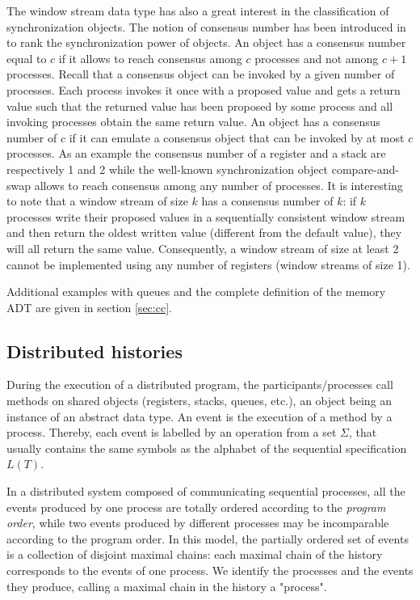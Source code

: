 \documentclass[9pt,numbers]{sigplanconf}
\begin{document}
The window stream data type has also a great interest in the classification of synchronization objects. The notion of consensus number has been introduced in \cite{herlihy1991wait} to rank the synchronization power of objects. An object has a consensus number equal to $c$ if it allows to reach consensus among $c$ processes and not among $c+1$ processes. Recall that a consensus object can be invoked by a given number of processes. Each process invokes it once with a proposed value and gets a return value such that the returned value has been proposed by some process and all invoking processes obtain the same return value. An object has a consensus number of $c$ if it can emulate a consensus object that can be invoked by at most $c$ processes. As an example the consensus number of a register and a stack are respectively 1 and 2 while the well-known synchronization object compare-and-swap allows to reach consensus among any number of processes. It is interesting to note that a window stream of size $k$ has a consensus number of $k$: if $k$ processes write their proposed values in a sequentially consistent window stream and then return the oldest written value (different from the default value), they will all return the same value. Consequently, a window stream of size at least 2 cannot be implemented using any number of registers (window streams of size 1). 

Additional examples with queues and the complete definition of the memory ADT are given in section \ref{sec:cc}.

\subsection{Distributed histories}

During the execution of a distributed program, the participants/processes call methods on
shared objects (registers, stacks, queues, etc.), an object being an instance of an abstract
data type. An event is the execution of a method by a process. Thereby, each event is labelled 
by an operation from a set $\Sigma$, that usually contains the same symbols as the alphabet 
of the sequential specification $L(T)$.

In a distributed system composed of communicating sequential processes,
all the events produced by one process are totally ordered according to the \emph{program order},
while two events produced by different processes may be incomparable according to the program order. 
In this model, the partially ordered set of events is a collection of disjoint maximal chains: 
each maximal chain of the history corresponds to the events of one process. 
We identify the processes and the events they produce, calling a maximal chain in the history a "process".
\end{document}
